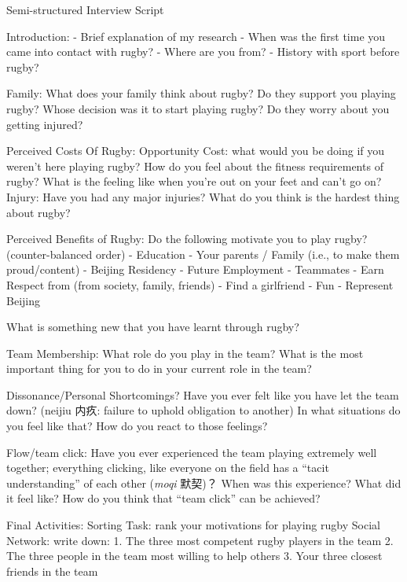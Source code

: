 



Semi-structured Interview Script

Introduction:
- Brief explanation of my research
- When was the first time you came into contact with rugby?
- Where are you from?
- History with sport before rugby?

Family:
What does your family think about rugby?
Do they support you playing rugby?
Whose decision was it to start playing rugby?
Do they worry about you getting injured?

Perceived Costs Of Rugby:
Opportunity Cost: what would you be doing if you weren’t here playing rugby?
How do you feel about the fitness requirements of rugby?
What is the feeling like when you’re out on your feet and can’t go on?
Injury: Have you had any major injuries?
What do you think is the hardest thing about rugby?

Perceived Benefits of Rugby:
Do the following motivate you to play rugby? (counter-balanced order)
- Education
- Your parents / Family (i.e., to make them proud/content)
- Beijing Residency
- Future Employment
- Teammates
- Earn Respect from (from society, family, friends)
- Find a girlfriend
- Fun
- Represent Beijing

What is something new that you have learnt through rugby?

Team Membership:
What role do you play in the team?
What is the most important thing for you to do in your current role in the team?

Dissonance/Personal Shortcomings?
Have you ever felt like you have let the team down?  (neijiu 内疚: failure to uphold obligation to another)
In what situations do you feel like that?
How do you react to those feelings?

Flow/team click:
Have you ever experienced the team playing extremely well together; everything clicking, like everyone on the field has a “tacit understanding” of each other (\textit{moqi} 默契)？
When was this experience?
What did it feel like?
How do you think that “team click” can be achieved?




Final Activities:
Sorting Task: rank your motivations for playing rugby
Social Network: write down:
1.	The three most competent rugby players in the team
2.	The three people in the team most willing to help others
3.	Your three closest friends in the team

 
